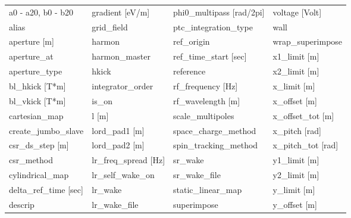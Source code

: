  \begin{tabular}{llll} \toprule
a0 - a20, b0 - b20               & gradient [eV/m]                  & phi0_multipass [rad/2pi]         & voltage [Volt]                   \\
alias                            & grid_field                       & ptc_integration_type             & wall                             \\
aperture [m]                     & harmon                           & ref_origin                       & wrap_superimpose                 \\
aperture_at                      & harmon_master                    & ref_time_start [sec]             & x1_limit [m]                     \\
aperture_type                    & hkick                            & reference                        & x2_limit [m]                     \\
bl_hkick [T*m]                   & integrator_order                 & rf_frequency [Hz]                & x_limit [m]                      \\
bl_vkick [T*m]                   & is_on                            & rf_wavelength [m]                & x_offset [m]                     \\
cartesian_map                    & l [m]                            & scale_multipoles                 & x_offset_tot [m]                 \\
create_jumbo_slave               & lord_pad1 [m]                    & space_charge_method              & x_pitch [rad]                    \\
csr_ds_step [m]                  & lord_pad2 [m]                    & spin_tracking_method             & x_pitch_tot [rad]                \\
csr_method                       & lr_freq_spread [Hz]              & sr_wake                          & y1_limit [m]                     \\
cylindrical_map                  & lr_self_wake_on                  & sr_wake_file                     & y2_limit [m]                     \\
delta_ref_time [sec]             & lr_wake                          & static_linear_map                & y_limit [m]                      \\
descrip                          & lr_wake_file                     & superimpose                      & y_offset [m]                     \\

\end{tabular}
